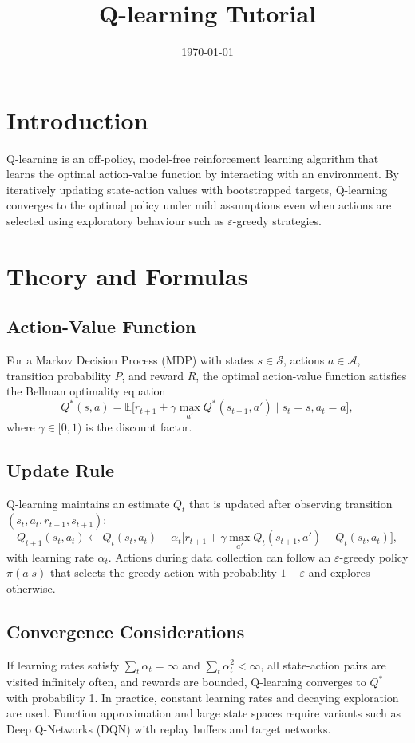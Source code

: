 ﻿\documentclass[12pt]{article}
\title{Q-learning Tutorial}
\author{}
\date{\today}
\begin{document}
\maketitle

\section{Introduction}
Q-learning is an off-policy, model-free reinforcement learning algorithm that learns the optimal action-value function by interacting with an environment. By iteratively updating state-action values with bootstrapped targets, Q-learning converges to the optimal policy under mild assumptions even when actions are selected using exploratory behaviour such as \(\varepsilon\)-greedy strategies.

\section{Theory and Formulas}
\subsection{Action-Value Function}
For a Markov Decision Process (MDP) with states \(s \in \mathcal{S}\), actions \(a \in \mathcal{A}\), transition probability \(P\), and reward \(R\), the optimal action-value function satisfies the Bellman optimality equation
\begin{equation}
Q^*(s,a) = \mathbb{E} \big[ r_{t+1} + \gamma \max_{a'} Q^*(s_{t+1}, a') \mid s_t = s, a_t = a \big],
\end{equation}
where \(\gamma \in [0,1)\) is the discount factor.

\subsection{Update Rule}
Q-learning maintains an estimate \(Q_t\) that is updated after observing transition \((s_t, a_t, r_{t+1}, s_{t+1})\):
\begin{equation}
Q_{t+1}(s_t, a_t) \leftarrow Q_t(s_t, a_t) + \alpha_t \Big[ r_{t+1} + \gamma \max_{a'} Q_t(s_{t+1}, a') - Q_t(s_t, a_t) \Big],
\end{equation}
with learning rate \(\alpha_t\). Actions during data collection can follow an \(\varepsilon\)-greedy policy \(\pi(a|s)\) that selects the greedy action with probability \(1-\varepsilon\) and explores otherwise.

\subsection{Convergence Considerations}
If learning rates satisfy \(\sum_t \alpha_t = \infty\) and \(\sum_t \alpha_t^2 < \infty\), all state-action pairs are visited infinitely often, and rewards are bounded, Q-learning converges to \(Q^*\) with probability 1. In practice, constant learning rates and decaying exploration are used. Function approximation and large state spaces require variants such as Deep Q-Networks (DQN) with replay buffers and target networks.
\end{document}
